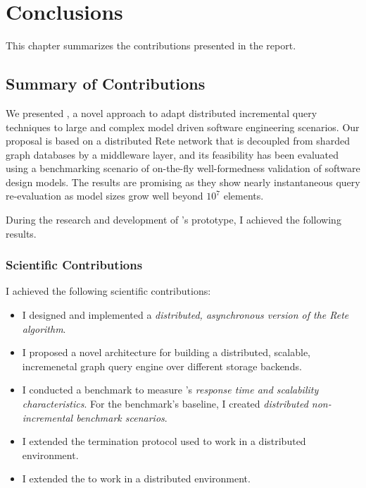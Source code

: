 \chapter{Conclusions}
\label{chap:conclusions}

This chapter summarizes the contributions presented in the report. 

\section{Summary of Contributions}

We presented \iqd{}, a novel approach to adapt distributed incremental query techniques to large and complex model driven software engineering scenarios. Our proposal is based on a distributed Rete network that is decoupled from sharded graph databases by a middleware layer, and its feasibility has been evaluated using a benchmarking scenario of on-the-fly well-formedness validation of software design models. The results are promising as they show nearly instantaneous query re-evaluation as model sizes grow well beyond $10^7$ elements.


During the research and development of \iqd{}'s prototype, I achieved the following results.

\subsection{Scientific Contributions}

I achieved the following scientific contributions:

\begin{itemize}
  \item I designed and implemented a \emph{distributed, asynchronous version of the Rete algorithm}. 
  \item I proposed a novel architecture for building a distributed, scalable, incremenetal graph query engine over different storage backends. %
  \item I conducted a benchmark to measure \iqd{}'s \emph{response time and scalability characteristics}. For the benchmark's baseline, I created \emph{distributed non-incremental benchmark scenarios}. 
  \item I extended the termination protocol used \eiq{} to work in a distributed environment. 
  \item I extended the \tb{} to work in a distributed environment. 
\end{itemize}

